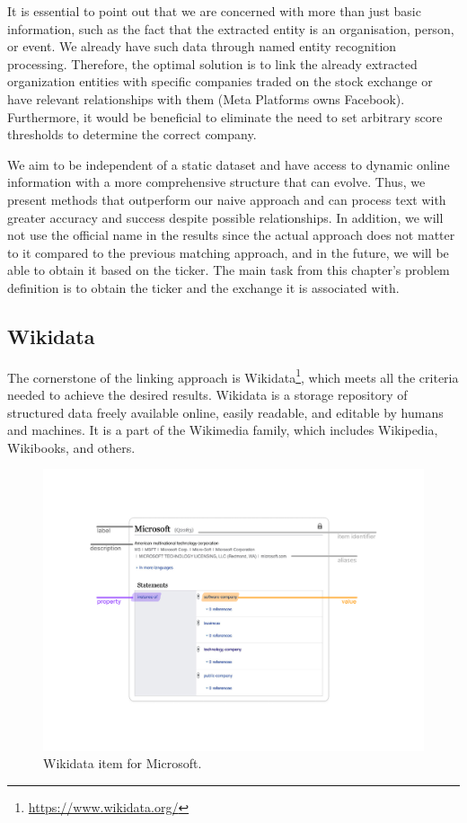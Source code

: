It is essential to point out that we are concerned with more than just basic information, such as the fact that the extracted entity is an organisation, person, or event. We already have such data through named entity recognition processing. Therefore, the optimal solution is to link the already extracted organization entities with specific companies traded on the stock exchange or have relevant relationships with them (Meta Platforms owns Facebook). Furthermore, it would be beneficial to eliminate the need to set arbitrary score thresholds to determine the correct company.

We aim to be independent of a static dataset and have access to dynamic online information with a more comprehensive structure that can evolve. Thus, we present methods that outperform our naive approach and can process text with greater accuracy and success despite possible relationships. In addition, we will not use the official name in the results since the actual approach does not matter to it compared to the previous matching approach, and in the future, we will be able to obtain it based on the ticker. The main task from this chapter's problem definition is to obtain the ticker and the exchange it is associated with.

\subsection{Wikidata}
\label{subsec:wikidata}
The cornerstone of the linking approach is Wikidata\footnote{\href{https://www.wikidata.org/}{https://www.wikidata.org/}}, which meets all the criteria needed to achieve the desired results. Wikidata is a storage repository of structured data freely available online, easily readable, and editable by humans and machines. It is a part of the Wikimedia family, which includes Wikipedia, Wikibooks, and others. 

\begin{figure}[ht]
    \centering
    \includegraphics[width=\textwidth]{img/wikidata-microsoft.pdf}
    \caption{Wikidata item for Microsoft.}
    \label{fig:wikidata-microsoft}
\end{figure}

